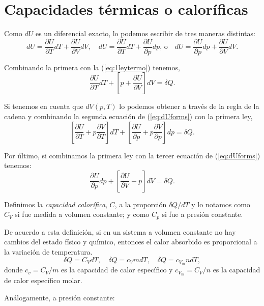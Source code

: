 \documentclass[openany]{book}
\begin{document}
\section{Capacidades térmicas o caloríficas}
Como $dU$ es un diferencial exacto, lo podemos escribir de tres maneras distintas:
\begin{equation}\label{eq:dUforms}
	dU=\frac{\partial U}{\partial T}dT+\frac{\partial U}{\partial V}dV,\quad dU=\frac{\partial U}{\partial T}dT+\frac{\partial U}{\partial p}dp,\, \mathrm{o}\quad dU=\frac{\partial U}{\partial p}dp+\frac{\partial U}{\partial V}dV.
\end{equation}
\par Combinando la primera con la (\ref{eq:1leytermo}) tenemos,
\begin{equation}\label{eq:dQ-TyV}
	\frac{\partial U}{\partial T}dT+\left[p+\frac{\partial U}{\partial V}\right]dV=\delta Q.
\end{equation}
\par Si tenemos en cuenta que $dV(p,T)$ lo podemos obtener a través de la regla de la cadena y combinando la segunda ecuación de (\ref{eq:dUforms}) con la primera ley,
\begin{equation}\label{eq:dQ-pyT}
	\left[\frac{\partial U}{\partial T}+p\frac{\partial V}{\partial T}\right]dT+\left[\frac{\partial U}{\partial p}+p\frac{\partial V}{\partial p}\right]dp=\delta Q.
\end{equation}
\par Por último, si combinamos la primera ley con la tercer ecuación de (\ref{eq:dUforms}) tenemos:
\begin{equation}\label{eq:dQ-pyV}
	\frac{\partial U}{\partial p}dp+\left[\frac{\partial U}{\partial V}-p\right]dV=\delta Q.
\end{equation}
\par Definimos la \emph{capacidad calorífica}, $C$, a la proporción $\delta Q/dT$ y lo notamos como $C_V$ si fue medida a volumen constante; y como $C_p$ si fue a presión constante.\par
De acuerdo a esta definición, si en un sistema a volumen constante no hay cambios del estado físico y químico, entonces el calor absorbido es proporcional a la variación de temperatura.
\begin{equation}\label{eq:dQ-cv}
	\delta Q=C_VdT,\quad\delta Q=c_VmdT,\quad\delta Q=c_{V_m}ndT,
\end{equation}
donde $c_v=C_V/m$ es la capacidad de calor específico y $c_{V_m}=C_V/n$ es la capacidad de calor específico molar.
\par Análogamente, a presión constante:
\end{document}
